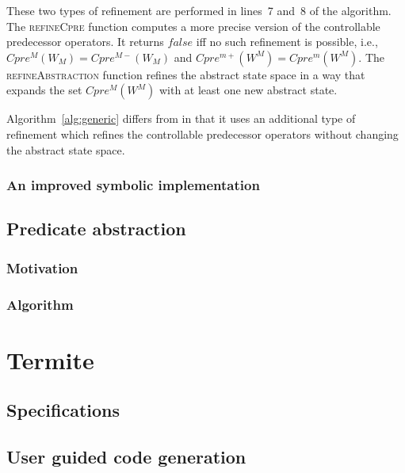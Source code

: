 \documentclass{article}
\begin{document}
These two types of refinement are performed in lines~7 and~8 of 
the algorithm.  The \textsc{refineCpre} function computes a more 
precise version of the controllable predecessor operators.  It 
returns $false$ iff no such refinement is possible, i.e., 
$Cpre^{M}(W_M)=Cpre^{M-}(W_M)$ and $Cpre^{m+}(W^M)=Cpre^{m}(W^M)$.  
The \textsc{refineAbstraction} function refines the abstract state 
space in a way that expands the set $Cpre^M(W^M)$ with at least 
one new abstract state.  

Algorithm~\ref{alg:generic} differs from \cite{Alfaro_Roy_07}
in that it uses an additional type of refinement which refines the 
controllable predecessor operators without changing the abstract
state space.


\subsubsection{An improved symbolic implementation}

\subsection{Predicate abstraction}
\subsubsection{Motivation}
\subsubsection{Algorithm}

\section{Termite}

\subsection{Specifications}
\subsection{User guided code generation}
\end{document}
